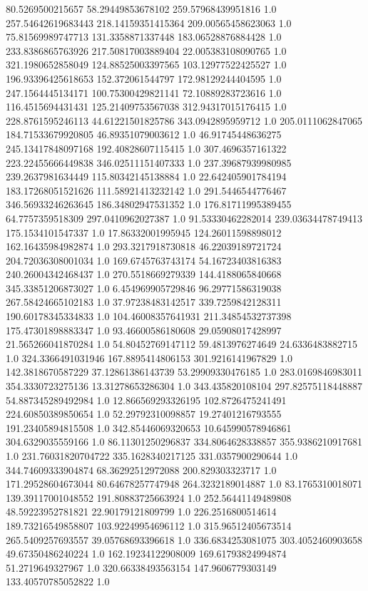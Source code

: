 80.5269500215657	58.29449853678102	259.57968439951816	1.0
257.54642619683443	218.14159351415364	209.00565458623063	1.0
75.81569989747713	131.3358871337448	183.06528876884428	1.0
233.8386865763926	217.50817003889404	22.005383108090765	1.0
321.1980652858049	124.88525003397565	103.12977522425527	1.0
196.93396425618653	152.372061544797	172.98129244404595	1.0
247.1564445134171	100.75300429821141	72.10889283723616	1.0
116.4515694431431	125.21409753567038	312.94317015176415	1.0
228.8761595246113	44.61221501825786	343.0942895959712	1.0
205.0111062847065	184.71533679920805	46.89351079003612	1.0
46.91745448636275	245.13417848097168	192.40828607115415	1.0
307.4696357161322	223.22455666449838	346.02511151407333	1.0
237.39687939980985	239.2637981634449	115.80342145138884	1.0
22.642405901784194	183.17268051521626	111.58921413232142	1.0
291.5446544776467	346.56933246263645	186.34802947531352	1.0
176.81711995389455	64.7757359518309	297.0410962027387	1.0
91.53330462282014	239.03634478749413	175.1534101547337	1.0
17.86332001995945	124.26011598898012	162.16435984982874	1.0
293.3217918730818	46.22039189721724	204.72036308001034	1.0
169.6745763743174	54.16723403816383	240.26004342468437	1.0
270.5518669279339	144.4188065840668	345.33851206873027	1.0
6.454969905729846	96.29771586319038	267.58424665102183	1.0
37.97238483142517	339.7259842128311	190.60178345334833	1.0
104.46008357641931	211.34854532737398	175.47301898883347	1.0
93.46600586180608	29.05908017428997	21.565266041870284	1.0
54.80452769147112	59.4813976274649	24.6336483882715	1.0
324.3366491031946	167.8895414806153	301.9216141967829	1.0
142.3818670587229	37.12861386143739	53.29909330476185	1.0
283.0169846983011	354.3330723275136	13.31278653286304	1.0
343.435820108104	297.82575118448887	54.887345289492984	1.0
12.866569293326195	102.8726475241491	224.60850389850654	1.0
52.29792310098857	19.27401216793555	191.23405894815508	1.0
342.85446069320653	10.645990578946861	304.6329035559166	1.0
86.11301250296837	334.8064628338857	355.9386210917681	1.0
231.76031820704722	335.1628340217125	331.0357900290644	1.0
344.74609333904874	68.36292512972088	200.829303323717	1.0
171.29528604673044	80.64678257747948	264.3232189014887	1.0
83.1765310018071	139.39117001048552	191.80883725663924	1.0
252.56441149489808	48.59223952781821	22.90179121809799	1.0
226.2516800514614	189.73216549858807	103.92249954696112	1.0
315.96512405673514	265.5409257693557	39.05768693396618	1.0
336.6834253081075	303.4052460903658	49.67350486240224	1.0
162.19234122908009	169.61793824994874	51.2719649327967	1.0
320.66338493563154	147.9606779303149	133.40570785052822	1.0
